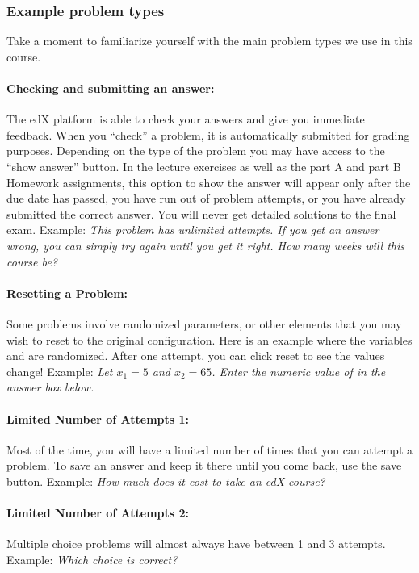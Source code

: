 \documentclass[pdftex, brazil, 12pt, twoside]{article}
\begin{document}
\subsubsection{Example problem types}
\label{gs-edx-example}

Take a moment to familiarize yourself with the main problem types we use in this course.

\paragraph{Checking and submitting an answer:}
The edX platform is able to check your answers and give you immediate feedback. When you ``check'' a problem, it is automatically submitted for grading purposes. Depending on the type of the problem you may have access to the ``show answer'' button. In the lecture exercises as well as the part A and part B Homework assignments, this option to show the answer will appear only after the due date has passed, you have run out of problem attempts, or you have already submitted the correct answer. You will never get detailed solutions to the final exam.
Example: \emph{This problem has unlimited attempts. If you get an answer wrong, you can simply try again until you get it right. How many weeks will this course be?}

\paragraph{Resetting a Problem:}
Some problems involve randomized parameters, or other elements that you may wish to reset to the original configuration. Here is an example where the variables and are randomized. After one attempt, you can click reset to see the values change!
Example: \emph{Let $x_1 = 5$ and $x_2 = 65$. Enter the numeric value of in the answer box below.}

\paragraph{Limited Number of Attempts 1:}
Most of the time, you will have a limited number of times that you can attempt a problem. To save an answer and keep it there until you come back, use the save button.
Example: \emph{How much does it cost to take an edX course?}

\paragraph{Limited Number of Attempts 2:}
Multiple choice problems will almost always have between 1 and 3 attempts.
Example: \emph{Which choice is correct?}
\end{document}
